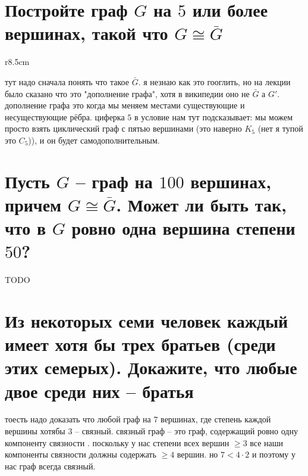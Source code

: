 \documentclass{article}
\begin{document}
  \clearpage
  \section{Постройте граф $G$ на $5$ или более вершинах, такой что $G \cong \bar{G}$}
  \begin{wrapfigure}{r}{8.5cm}
    \vspace{-.5cm}
    \hfill
    \vspace{-1cm}
  \end{wrapfigure}
  тут надо сначала понять что такое $\bar{G}$.
  я незнаю как это гооглить, но на лекции было сказано что это "{}дополнение графа"{}, хотя в википедии оно не $\bar{G}$ а $G'$.
  дополнение графа это когда мы меняем местами существующие и несуществующие рёбра.
  циферка $5$ в условие нам тут подсказывает: мы можем просто взять циклический граф с пятью вершинами
  (это наверно $K_5$ (нет я тупой это $C_5$)),
  и он будет самодополнительным.

  \section{Пусть $G$ -- граф на $100$ вершинах, причем $G \cong \bar{G}$. Может ли быть так, что в $G$ ровно одна вершина степени $50$?}
  TODO

  \section{Из некоторых семи человек каждый имеет хотя бы трех братьев (среди этих семерых). Докажите, что любые двое среди них -- братья}
  тоесть надо доказать что любой граф на $7$ вершинах, где степень каждой вершины хотябы $3$ -- связный.
  связный граф -- это граф, содержащий ровно одну компоненту связности \cite{link}.
  поскольку у нас степени всех вершин $\ge 3$ все наши компоненты связности должны содержать $\ge 4$ вершин.
  но $7 < 4 \cdot 2$ и поэтому у нас граф всегда связный.
\end{document}
